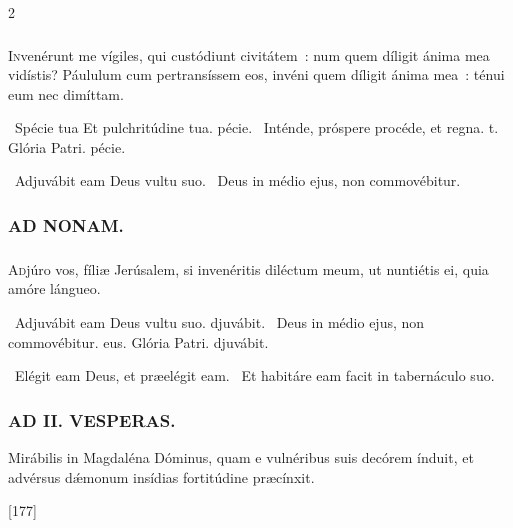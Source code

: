 \documentclass[9pt,twoside]{extarticle}
\begin{document}
\begin{multicols}{2}
{\subsubsection*{}
\lettrine{I}nvenérunt me vígiles, qui custódiunt civitátem~: num quem díligit ánima mea vidístis? Páululum cum pertransíssem eos, invéni quem díligit ánima mea~: ténui eum nec dimíttam.

\begin{tightlist}{}
\item {}~Spécie tua \textred{*} Et pulchritúdine tua. pécie. ~Inténde, próspere procéde, et regna. t. Glória Patri. pécie.
\item {}~Adjuvábit eam Deus vultu suo. ~Deus in médio ejus, non commovébitur.
\end{tightlist}

\subsubsection*{\center \textsc{AD NONAM.}}
\subsubsection*{}
\lettrine{A}djúro vos, fíliæ Jerúsalem, si invenéritis diléctum meum, ut nuntiétis ei, quia amóre lángueo.

\begin{tightlist}{}
\item {}~Adjuvábit eam \textred{*} Deus vultu suo. djuvábit. ~Deus in médio ejus, non commovébitur. eus. Glória Patri. djuvábit.
\item {}~Elégit eam Deus, et præelégit eam. ~Et habitáre eam facit in tabernáculo suo.
\end{tightlist}

\subsubsection*{\center \textsc{AD II. VESPERAS.}}
\begin{tightlist}{}
\item {} Mirábilis in Magdaléna Dóminus, quam e vulnéribus suis decórem índuit, et advérsus dǽmonum insídias fortitúdine præcínxit. 
\item {} [177]
\end{tightlist}

}
\end{multicols}
\end{document}
